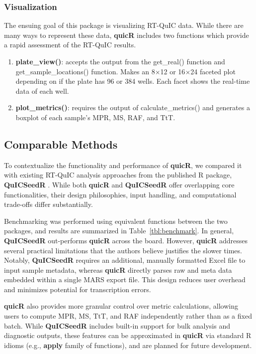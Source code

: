 \documentclass[preprint,12pt,a4paper]{elsarticle}
\begin{document}
            \subsubsection{Visualization}
                The ensuing goal of this package is visualizing RT-QuIC data. While there are many ways to represent these data, \textbf{quicR} includes two functions which provide a rapid assessment of the RT-QuIC results.
                \begin{enumerate}
                    \item \textbf{plate\_view()}: accepts the output from the get\_real() function and get\_sample\_locations() function. Makes an 8$\times$12 or 16$\times$24 faceted plot depending on if the plate has 96 or 384 wells. Each facet shows the real-time data of each well.
                    \item \textbf{plot\_metrics()}: requires the output of calculate\_metrics() and generates a boxplot of each sample's MPR, MS, RAF, and TtT.
                \end{enumerate}
        
        \subsection{Comparable Methods}
            To contextualize the functionality and performance of \textbf{quicR}, we compared it with existing RT-QuIC analysis approaches from the published R package, \textbf{QuICSeedR} \cite{Li2025}. While both \textbf{quicR} and \textbf{QuICSeedR} offer overlapping core functionalities, their design philosophies, input handling, and computational trade-offs differ substantially.

            Benchmarking was performed using equivalent functions between the two packages, and results are summarized in Table~\ref{tbl:benchmark}. In general, \textbf{QuICSeedR} out-performs \textbf{quicR} across the board. However, \textbf{quicR} addresses several practical limitations that the authors believe justifies the slower times. Notably, \textbf{QuICSeedR} requires an additional, manually formatted Excel file to input sample metadata, whereas \textbf{quicR} directly parses raw and meta data embedded within a single MARS export file. This design reduces user overhead and minimizes potential for transcription errors.

            \textbf{quicR} also provides more granular control over metric calculations, allowing users to compute MPR, MS, TtT, and RAF independently rather than as a fixed batch. While \textbf{QuICSeedR} includes built-in support for bulk analysis and diagnostic outputs, these features can be approximated in \textbf{quicR} via standard R idioms (e.g., \textbf{apply} family of functions), and are planned for future development.
\end{document}

